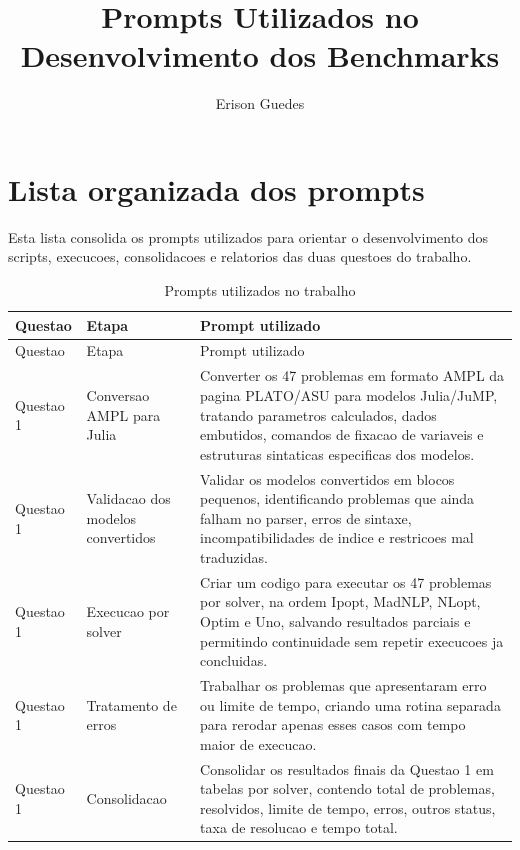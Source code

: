 \documentclass[12pt,a4paper]{article}
\title{Prompts Utilizados no Desenvolvimento dos Benchmarks}
\author{Erison Guedes}
\date{}
\begin{document}
\maketitle

\section*{Lista organizada dos prompts}

Esta lista consolida os prompts utilizados para orientar o desenvolvimento dos scripts, execucoes, consolidacoes e relatorios das duas questoes do trabalho.

\renewcommand{\arraystretch}{1.25}
\begin{longtable}{p{2.2cm}p{3.8cm}p{8.6cm}}
\caption{Prompts utilizados no trabalho}\\
\toprule
Questao & Etapa & Prompt utilizado \\
\midrule
\endfirsthead
\toprule
Questao & Etapa & Prompt utilizado \\
\midrule
\endhead
\bottomrule
\endfoot

Questao 1 & Conversao AMPL para Julia &
Converter os 47 problemas em formato AMPL da pagina PLATO/ASU para modelos Julia/JuMP, tratando parametros calculados, dados embutidos, comandos de fixacao de variaveis e estruturas sintaticas especificas dos modelos. \\

Questao 1 & Validacao dos modelos convertidos &
Validar os modelos convertidos em blocos pequenos, identificando problemas que ainda falham no parser, erros de sintaxe, incompatibilidades de indice e restricoes mal traduzidas. \\

Questao 1 & Execucao por solver &
Criar um codigo para executar os 47 problemas por solver, na ordem Ipopt, MadNLP, NLopt, Optim e Uno, salvando resultados parciais e permitindo continuidade sem repetir execucoes ja concluidas. \\

Questao 1 & Tratamento de erros &
Trabalhar os problemas que apresentaram erro ou limite de tempo, criando uma rotina separada para rerodar apenas esses casos com tempo maior de execucao. \\

Questao 1 & Consolidacao &
Consolidar os resultados finais da Questao 1 em tabelas por solver, contendo total de problemas, resolvidos, limite de tempo, erros, outros status, taxa de resolucao e tempo total. \\


\end{longtable}
\end{document}
